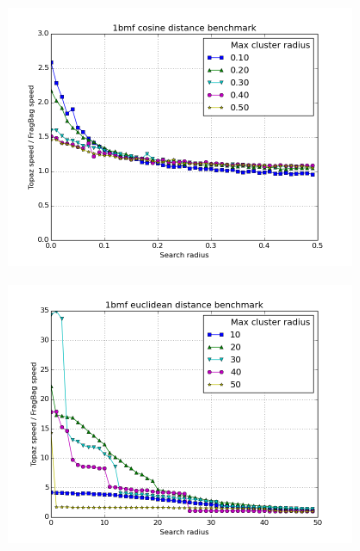 \documentclass[review,preprint,12pt]{elsarticle}
\theoremstyle{definition}
\theoremstyle{remark}
\numberwithin{equation}{section}
\begin{document}
\begin{figure}[tbp]
\begin{subfigure}[b]{0.40\textwidth}
        \includegraphics[width=1\textwidth]{assets/1bmf_cosine.png}
    \end{subfigure}%
    \begin{subfigure}[b]{0.40\textwidth}
        \includegraphics[width=1\textwidth]{assets/1bmf_euclid.png}
    \end{subfigure}
    \begin{subfigure}[b]{0.40\textwidth}

\end{subfigure}
\end{figure}
\end{document}
